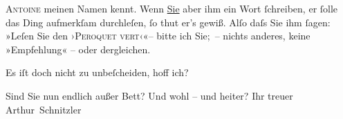                   \textsc{Antoine} meinen Namen kennt. Wenn \uline{Sie} aber ihm ein {\pb}Wort{ }ſchreiben, er{ }ſolle das Ding aufmerkſam
               durchleſen,{ }ſo thut er’s gewiß. Alſo daſs Sie ihm{ }ſagen: »Leſen Sie den ›\textsc{Peroquet vert}‹«– bitte ich Sie; – nichts anderes, keine »Empfehlung« – oder dergleichen.\pend
           
\pstart
           Es iſt doch nicht zu unbeſcheiden, hoff ich?\pend
           
\pstart
           Sind Sie nun endlich außer Bett? Und wohl – und heiter? Ihr treuer \spacefill\mbox{Arthur
                  Schnitzler}\pend
           \endnumbering{}  \newcommand{\dateiname}{L00923}\newcommand{\titel}{Arthur Schnitzler an Georg Brandes, 8. 6. 1899}\newcommand{\editorInnen}{Martin Anton Müller und Gerd-Hermann Susen}

